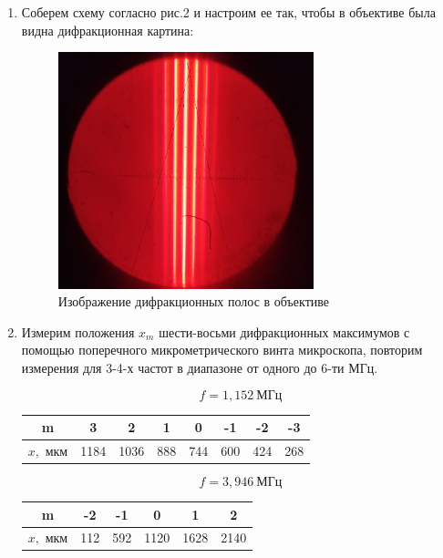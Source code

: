 \documentclass[a4paper, 12pt]{article}%
\begin{document}
\begin{enumerate}

\item Соберем схему согласно рис.2 и настроим ее так, чтобы в объективе была видна дифракционная картина:

\begin{figure}[h!]
    \centering	
    \includegraphics[width=0.7\textwidth]{images/1_1.jpg}
    \caption{Изображение дифракционных полос в объективе}
    \label{1_1}
\end{figure}

\item Измерим положения $x_m$ шести-восьми дифракционных максимумов с помощью поперечного микрометрического винта микроскопа, повторим измерения для 3-4-х частот в диапазоне от одного до 6-ти МГц.

\[f = 1,152 \: \text{МГц}\]

\begin{center}
\begin{tabular}{|c|c|c|c|c|c|c|c|}
\hline 
m & 3 & 2 & 1 & 0 & -1 & -2 & -3 \\ 
\hline 
$x,$ мкм & 1184 & 1036 & 888 & 744 & 600 & 424 & 268 \\ 
\hline 
\end{tabular} 
\end{center}

\[f = 3,946 \: \text{МГц}\]

\begin{center}
\begin{tabular}{|c|c|c|c|c|c|}
\hline 
m & -2 & -1 & 0 & 1 & 2 \\ 
\hline 
$x,$ мкм & 112 & 592 & 1120 & 1628 & 2140 \\ 
\hline 
\end{tabular} 
\end{center}


\end{enumerate}
\end{document}
